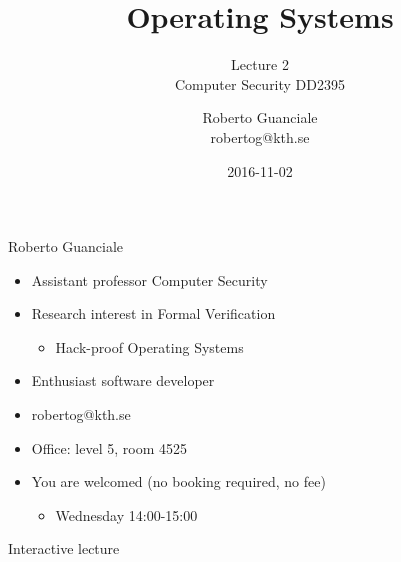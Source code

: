 \documentclass{beamer}
\title{Operating Systems}
\subtitle{Lecture 2 \\ Computer Security DD2395}
\author[R. Guanciale]{
  Roberto Guanciale\\
  robertog@kth.se
}
\date{2016-11-02}
\begin{document}
\maketitle

\begin{frame}{Roberto Guanciale}
  \begin{itemize}
    \item Assistant professor \alert{Computer Security}
    \item Research interest in \alert{Formal Verification}
      \begin{itemize}
        \item Hack-proof Operating Systems
      \end{itemize}
    \item Enthusiast software developer
    \item robertog@kth.se
    \item Office: level 5, room 4525
    \item You are welcomed (no booking required, no fee)
    \begin{itemize}
      \item Wednesday 14:00-15:00
    \end{itemize}
  \end{itemize}
\end{frame}


\begin{frame}{Interactive lecture}
\end{frame}
\end{document}
